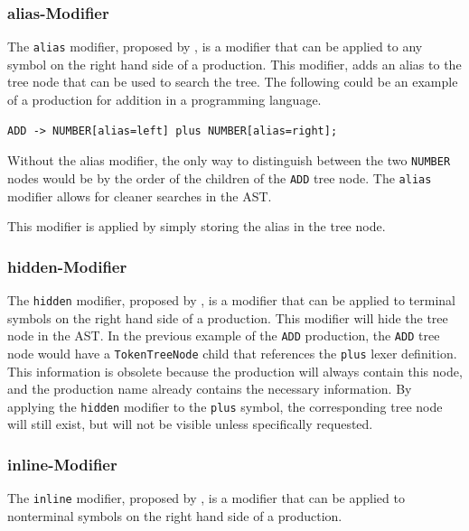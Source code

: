 \subsubsection{alias-Modifier}

The \verb|alias| modifier, proposed by  \cite{GeneratingRewritableAST}, is a modifier that can be applied to any symbol on the right hand side of a production. 
This modifier, adds an alias to the tree node that can be used to search the tree. 
The following could be an example of a production for addition in a programming language.

\begin{verbatim}
ADD -> NUMBER[alias=left] plus NUMBER[alias=right];
\end{verbatim}

Without the alias modifier, the only way to distinguish between the two \verb|NUMBER| nodes would be by the order of the children of the \verb|ADD| tree node. 
The \verb|alias| modifier allows for cleaner searches in the AST.

This modifier is applied by simply storing the alias in the tree node.


\subsubsection{hidden-Modifier}

The \verb|hidden| modifier, proposed by \cite{GeneratingRewritableAST}, is a modifier that can be applied to terminal symbols on the right hand side of a production.
This modifier will hide the tree node in the AST. 
In the previous example of the \verb|ADD| production, the \verb|ADD| tree node would have a \verb|TokenTreeNode| child that references the \verb|plus| lexer definition. 
This information is obsolete because the production will always contain this node, and the production name already contains the necessary information. 
By applying the \verb|hidden| modifier to the \verb|plus| symbol, the corresponding tree node will still exist, but will not be visible unless specifically requested.

\subsubsection{inline-Modifier}

The \verb|inline| modifier, proposed by \cite{GeneratingRewritableAST}, is a modifier that can be applied to nonterminal symbols on the right hand side of a production. 

